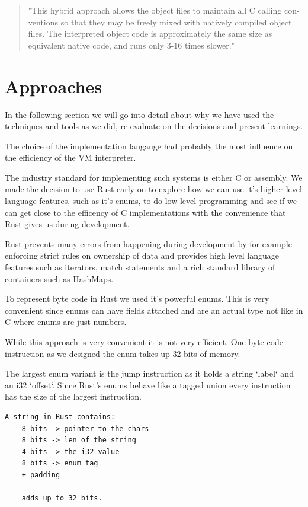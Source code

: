 \documentclass{article}
\begin{document}
\begin{quotation}
"This hybrid approach allows the object files to maintain all C calling con-
ventions so that they may be freely mixed with natively compiled object
files. The interpreted object code is approximately the same size as
equivalent native code, and runs only 3-16 times slower." ~\cite{superoperator}
\end{quotation}

\section{Approaches}
In the following section we will go into detail about why we have used the 
techniques and tools as we did, re-evaluate on the decisions and present 
learnings.

The choice of the implementation langauge had probably the most influence on
the efficiency of the VM interpreter.

The industry standard for implementing such systems is either C or assembly.
We made the decision to use Rust early on to explore how we can use it's
higher-level language features, such as it's enums, to do low level programming
and see if we can get close to the efficency of C implementations with the
convenience that Rust gives us during development.

Rust prevents many errors from happening during development by for example
enforcing strict rules on ownership of data and provides high level language
features such as iterators, match statements and a rich standard library of 
containers such as HashMaps.

To represent byte code in Rust we used it's powerful enums. This is very
convenient since enums can have fields attached and are an actual type not like
in C where enums are just numbers.

While this approach is very convenient it is not very efficient. One byte code
instruction as we designed the enum takes up 32 bits of memory.

The largest enum variant is the jump instruction as it holds a string `label`
and an i32 `offset`. Since Rust's enums behave like a tagged union every
instruction has the size of the largest instruction.

\begin{verbatim}
A string in Rust contains:
    8 bits -> pointer to the chars
    8 bits -> len of the string
    4 bits -> the i32 value
    8 bits -> enum tag
    + padding

    adds up to 32 bits.
\end{verbatim}
\end{document}
